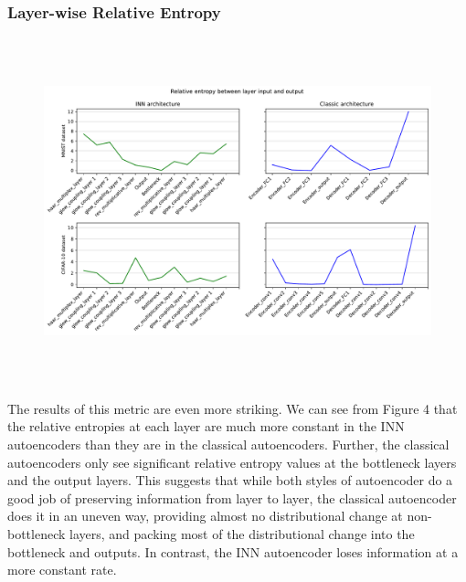 \documentclass[11pt,letterpaper]{article}
\begin{document}
     \subsubsection{Layer-wise Relative Entropy}
     \begin{figure}[!htb]
     \begin{center}
        \caption{}
        \includegraphics[height=10cm]{./pics/relative_entropies.pdf}
     \end{center}
     \end{figure}
      The results of this metric are even more striking. We can see from Figure 4 that the relative entropies at each layer are much more constant in the INN autoencoders than they are in the classical autoencoders. Further, the classical autoencoders only see significant relative entropy values at the bottleneck layers and the output layers. This suggests that while both styles of autoencoder do a good job of preserving information from layer to layer, the classical autoencoder does it in an uneven way, providing almost no distributional change at non-bottleneck layers, and packing most of the distributional change into the bottleneck and outputs. In contrast, the INN autoencoder loses information at a more constant rate.
\end{document}
